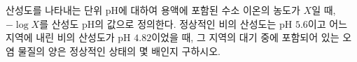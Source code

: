 산성도를 나타내는 단위 pH에 대하여 용액에 포함된 수소 이온의 농도가 $X$일 때, $-\log X$를 산성도 pH의 값으로 정의한다. 정상적인 비의 산성도는 pH $5.6$이고 어느 지역에 내린 비의 산성도가 pH $4.82$이었을 때, 그 지역의 대기 중에 포함되어 있는 오염 물질의 양은 정상적인 상태의 몇 배인지 구하시오. 
